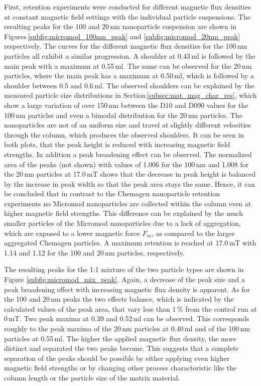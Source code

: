 First, retention experiments were conducted for different magnetic flux densities at constant magnetic field settings with the individual particle suspensions. The resulting peaks for the 100 and 20\,nm nanoparticle suspension are shown in Figures\,\ref{subfig:micromod_100nm_peak} and \ref{subfig:micromod_20nm_peak} respectively. The curves for the different magnetic flux densities for the 100\,nm particles all exhibit a similar progression. A shoulder at 0.43\,ml is followed by the main peak with a maximum at 0.55\,ml. The same can be observed for the 20\,nm particles, where the main peak has a maximum at 0.50\,ml, which is followed by a shoulder between 0.5 and 0.6\,ml. The observed shoulders can be explained by the measured particle size distributions in Section\,\ref{subsec:mat_mag_char_res}, which show a large variation of over 150\,nm between the D10 and D090 values for the 100\,nm particles and even a bimodal distribution for the 20\,nm particles. The nanoparticles are not of an uniform size and travel at slightly different velocities through the column, which produces the observed shoulders. 
It can be seen in both plots, that the peak height is reduced with increasing magnetic field strengths. In addition a peak broadening effect can be observed. The normalized area of the peaks (not shown) with values of 1.006 for the 100\,nm and 1.008 for the 20\,nm particles at 17.0\,mT shows that the decrease in peak height is balanced by the increase in peak width so that the peak area stays the same. Hence, it can be concluded that in contrast to the Chemagen nanoparticle retention experiments no Micromod nanoparticles are collected within the column even at higher magnetic field strengths. This difference can be explained by the much smaller particles of the Micromod nanoparticles due to a lack of aggregation, which are exposed to a lower magnetic force $F_{m}$, as compared to the larger aggregated Chemagen particles. A maximum retention is reached at 17.0\,mT with 1.14 and 1.12 for the 100 and 20\,nm particles, respectively.

The resulting peaks for the 1:1 mixture of the two particle types are shown in Figure \ref{subfig:micromod_mix_peak}. Again, a decrease of the peak size and a peak broadening effect with increasing magnetic flux density is apparent. As for the 100 and 20\,nm peaks the two effects balance, which is indicated by the calculated values of the peak area, that vary less than 1\,\% from the control run at 0\,mT. Two peak maxima at 0.39 and 0.52\,ml can be observed. This corresponds roughly to the peak maxima of the 20\,nm particles at 0.40\,ml and of the 100\,nm particles at 0.55\,ml. The higher the applied magnetic flux density, the more distinct and separated the two peaks become. This suggests that a complete separation of the peaks should be possible by either applying even higher magnetic field strengths or by changing other process characteristic like the column length or the particle size of the matrix material.
     
